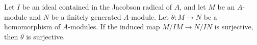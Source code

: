 Let $I$ be an ideal contained in the Jacobson radical of $A$, and let $M$ be an
$A$-module and $N$ be a finitely generated $A$-module. Let $\theta\colon M\to N$
be a homomorphism of $A$-modules. If the induced map $M/IM\to N/IN$ is surjective,
then $\theta$ is surjective.
